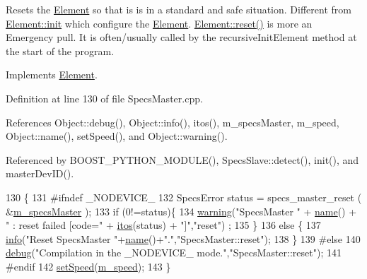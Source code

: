 Resets the \hyperlink{classElement}{Element} so that is is in a standard and safe situation. Different from \hyperlink{classElement_af42754b5cabc198869222725218d695c}{Element\+::init} which configure the \hyperlink{classElement}{Element}. \hyperlink{classElement_a69efffa22f06909d768149715565cb56}{Element\+::reset()} is more an Emergency pull. It is often/usually called by the recursive\+Init\+Element method at the start of the program. 

Implements \hyperlink{classElement_a69efffa22f06909d768149715565cb56}{Element}.



Definition at line 130 of file Specs\+Master.\+cpp.



References Object\+::debug(), Object\+::info(), itos(), m\+\_\+specs\+Master, m\+\_\+speed, Object\+::name(), set\+Speed(), and Object\+::warning().



Referenced by B\+O\+O\+S\+T\+\_\+\+P\+Y\+T\+H\+O\+N\+\_\+\+M\+O\+D\+U\+L\+E(), Specs\+Slave\+::detect(), init(), and master\+Dev\+I\+D().


\begin{DoxyCode}
130                        \{
131 \textcolor{preprocessor}{#ifndef \_NODEVICE\_
}
132   SpecsError status = specs\_master\_reset ( &\hyperlink{classSpecsMaster_a32497dbb9887b6c546113135f3acc6b1}{m\_specsMaster} );
133   \textcolor{keywordflow}{if} (0!=status)\{
134     \hyperlink{classObject_a65cd4fda577711660821fd2cd5a3b4c9}{warning}(\textcolor{stringliteral}{"SpecsMaster "} + \hyperlink{classObject_a300f4c05dd468c7bb8b3c968868443c1}{name}() + \textcolor{stringliteral}{" : reset failed [code="} + \hyperlink{Tools_8h_af330027dbdafb9a30768b3613c553e60}{itos}(status) + \textcolor{stringliteral}{"]"},\textcolor{stringliteral}{"reset"})
      ;
135   \}
136   \textcolor{keywordflow}{else} \{
137     \hyperlink{classObject_a644fd329ea4cb85f54fa6846484b84a8}{info}(\textcolor{stringliteral}{"Reset SpecsMaster "}+\hyperlink{classObject_a300f4c05dd468c7bb8b3c968868443c1}{name}()+\textcolor{stringliteral}{"."},\textcolor{stringliteral}{"SpecsMaster::reset"});
138   \}
139 \textcolor{preprocessor}{#else
}
140   \hyperlink{classObject_aac010553f022165573714b7014a15f0d}{debug}(\textcolor{stringliteral}{"Compilation in the \_NODEVICE\_ mode."},\textcolor{stringliteral}{"SpecsMaster::reset"});
141 \textcolor{preprocessor}{#endif
}
142   \hyperlink{classSpecsMaster_a25c7a250f74f4d1148240f3ab0df160b}{setSpeed}(\hyperlink{classSpecsMaster_af75996281787299ccd92555512802814}{m\_speed});
143 \}
\end{DoxyCode}
\mbox{\label{classSpecsMaster_acb635bc974bb3f4528e769251c3b30a9}} 

